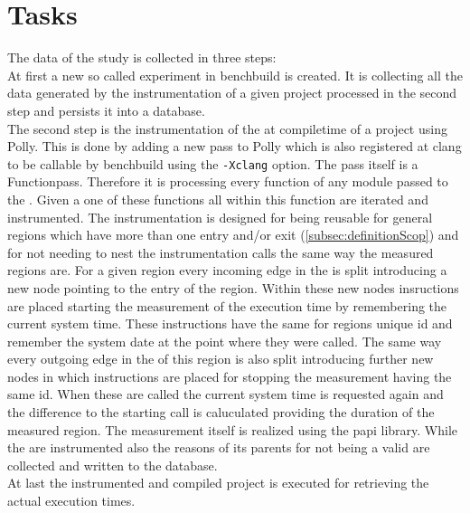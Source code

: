 \section{Tasks}
The data of the study is collected in three steps:\\
At first a new so called experiment in benchbuild is created.
It is collecting all the data generated by the instrumentation of a given project processed in the second step and persists it into a database.\\
The second step is the instrumentation of the \scops at compiletime of a project using Polly.
This is done by adding a new pass to Polly which is also registered at clang to be callable by benchbuild using the \texttt{-Xclang} option.
The pass itself is a Functionpass.
Therefore it is processing every function of any module passed to the \opt.
Given a one of these functions all \scops within this function are iterated and instrumented.
The instrumentation is designed for being reusable for general regions which have more than one entry and/or exit (\autoref{subsec:definitionScop}) and for not needing to nest the instrumentation calls the same way the measured regions are.
For a given region every incoming edge in the \cfg is split introducing a new node pointing to the entry of the region.
Within these new nodes insructions are placed starting the measurement of the execution time by remembering the current system time.
These instructions have the same for regions unique id and remember the system date at the point where they were called.
The same way every outgoing edge in the \cfg of this region is also split introducing further new nodes in which instructions are placed for stopping the measurement having the same id.
When these are called the current system time is requested again and the difference to the starting call is caluculated providing the duration of the measured region.
The measurement itself is realized using the papi library.
While the \scops are instrumented also the reasons of its parents for not being a valid \scop are collected and written to the database.\\
At last the instrumented and compiled project is executed for retrieving the actual execution times.
